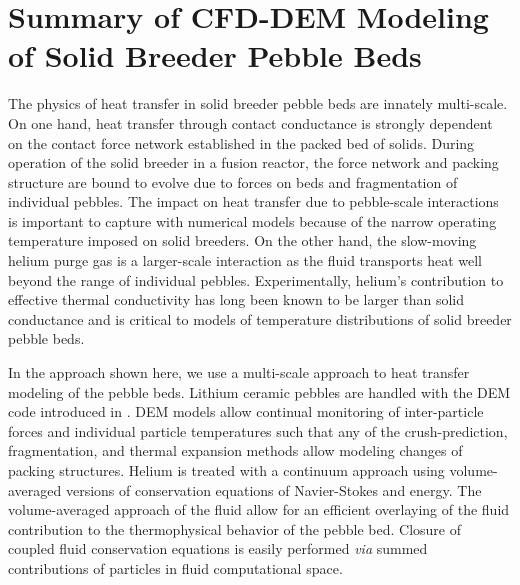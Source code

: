 \FloatBarrier



%
%
\section{Summary of CFD-DEM Modeling of Solid Breeder Pebble Beds}
The physics of heat transfer in solid breeder pebble beds are innately multi-scale. On one hand, heat transfer through contact conductance is strongly dependent on the contact force network established in the packed bed of solids. During operation of the solid breeder in a fusion reactor, the force network and packing structure are bound to evolve due to forces on beds and fragmentation of individual pebbles. The impact on heat transfer due to pebble-scale interactions is important to capture with numerical models because of the narrow operating temperature imposed on solid breeders. On the other hand, the slow-moving helium purge gas is a larger-scale interaction as the fluid transports heat well beyond the range of individual pebbles. Experimentally, helium's contribution to effective thermal conductivity has long been known to be larger than solid conductance and is critical to models of temperature distributions of solid breeder pebble beds.

In the approach shown here, we use a multi-scale approach to heat transfer modeling of the pebble beds. Lithium ceramic pebbles are handled with the DEM code introduced in . DEM models allow continual monitoring of inter-particle forces and individual particle temperatures such that any of the crush-prediction, fragmentation, and thermal expansion methods allow modeling changes of packing structures. Helium is treated with a continuum approach using volume-averaged versions of conservation equations of Navier-Stokes and energy. The volume-averaged approach of the fluid allow for an efficient overlaying of the fluid contribution to the thermophysical behavior of the pebble bed. Closure of coupled fluid conservation equations is easily performed \textit{via} summed contributions of particles in fluid computational space. 

